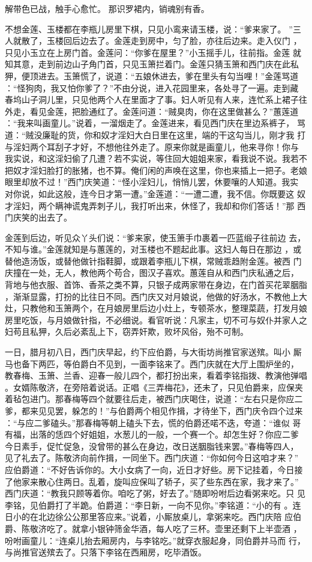 解带色已战，触手心愈忙。
那识罗裙内，销魂别有香。

不想金莲、玉楼都在李瓶儿房里下棋，只见小鸾来请玉楼，说：“爹来家了。
”三人就散了，玉楼回后边去了。金莲走到房中，匀了脸，亦往后边来。走入仪门
，只见小玉立在上房门首。金莲问：“你爹在屋里？”小玉摇手儿，往前指。金莲
就知其意，走到前边山子角门首，只见玉箫拦着门。金莲只猜玉箫和西门庆在此私
狎，便顶进去。玉箫慌了，说道：“五娘休进去，爹在里头有勾当哩！”金莲骂道
：“怪狗肉，我又怕你爹了？”不由分说，进入花园里来，各处寻了一遍。走到藏
春坞山子洞儿里，只见他两个人在里面才了事。妇人听见有人来，连忙系上裙子往
外走，看见金莲，把脸通红了。金莲问道：“贼臭肉，你在这里做甚么？”蕙莲道
：“我来叫画童儿。”说着，一溜烟走了。金莲进来，看见西门庆在里边系裤子，
骂道：“贼没廉耻的货，你和奴才淫妇大白日里在这里，端的干这勾当儿，刚才我
打与淫妇两个耳刮子才好，不想他往外走了。原来你就是画童儿，他来寻你！你与
我实说，和这淫妇偷了几遭？若不实说，等住回大姐姐来家，看我说不说。我若不
把奴才淫妇脸打的胀猪，也不算。俺们闲的声唤在这里，你也来插上一把子。老娘
眼里却放不过！”西门庆笑道：“怪小淫妇儿，悄悄儿罢，休要嚷的人知道。我实
对你说，如此这般，连今日才第一遭。”金莲道：“一遭二遭，我不信。你既要这
奴才淫妇，两个瞒神谎鬼弄刺子儿，我打听出来，休怪了，我却和你们答话！”那
西门庆笑的出去了。

金莲到后边，听见众丫头们说：“爹来家，使玉箫手巾裹着一匹蓝缎子往前边
去，不知与谁。”金莲就知是与蕙莲的，对玉楼也不题起此事。这妇人每日在那边
，或替他造汤饭，或替他做针指鞋脚，或跟着李瓶儿下棋，常贼乖趋附金莲。被西
门庆撞在一处，无人，教他两个苟合，图汉子喜欢。蕙莲自从和西门庆私通之后，
背地与他衣服、首饰、香茶之类不算，只银子成两家带在身边，在门首买花翠胭脂
，渐渐显露，打扮的比往日不同。西门庆又对月娘说，他做的好汤水，不教他上大
灶，只教他和玉箫两个，在月娘房里后边小灶上，专顿茶水，整理菜蔬，打发月娘
房里吃饭，与月娘做针指，不必细说。看官听说：凡家主，切不可与奴仆并家人之
妇苟且私狎，久后必紊乱上下，窃弄奸欺，败坏风俗，殆不可制。

一日，腊月初八日，西门庆早起，约下应伯爵，与大街坊尚推官家送殡。叫小
厮马也备下两匹，等伯爵白不见到，一面李铭来了。西门庆就在大厅上围炉坐的，
教春梅、玉箫、兰香、迎春一般儿四个，都打扮出来，看着李铭指拨、教演他弹唱
。女婿陈敬济，在旁陪着说话。正唱《三弄梅花》，还未了，只见伯爵来，应保夹
着毡包进门。那春梅等四个就要往后走，被西门庆喝住，说道：“左右只是你应二
爹，都来见见罢，躲怎的！”与伯爵两个相见作揖，才待坐下，西门庆令四个过来
：“与应二爹磕头。”那春梅等朝上磕头下去，慌的伯爵还喏不迭，夸道：“谁似
哥有福，出落的恁四个好姐姐，水葱儿的一般，一个赛一个。却怎生好？你应二爹
今日素手，促忙促急，没曾带的甚么在身边，改日送胭脂钱来罢。”春梅等四人，
见了礼去了。陈敬济向前作揖，一同坐下。西门庆道：“你如何今日这咱才来？”
应伯爵道：“不好告诉你的。大小女病了一向，近日才好些。房下记挂着，今日接
了他家来散心住两日。乱着，旋叫应保叫了轿子，买了些东西在家，我才来了。”
西门庆道：“教我只顾等着你。咱吃了粥，好去了。”随即吩咐后边看粥来吃。只
见李铭，见伯爵打了半跪。伯爵道：“李日新，一向不见你。”李铭道：“小的有
。连日小的在北边徐公公那里答应来。”说着，小厮放桌儿，拿粥来吃。西门庆陪
应伯爵、陈敬济吃了。就拿小银钟筛金华酒，每人吃了三杯。壶里还剩下上半壶酒
，吩咐画童儿：“连桌儿抬去厢房内，与李铭吃。”就穿衣服起身，同伯爵并马而
行，与尚推官送殡去了。只落下李铭在西厢房，吃毕酒饭。

